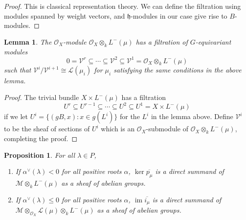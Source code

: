 \documentclass[11pt, a4paper]{article}
\newtheorem{lemma}[theorem]{Lemma}
\newtheorem{proposition}[theorem]{Proposition}
\theoremstyle{definition}
\newcommand{\im}[0]{\operatorname{im}}
\newcommand{\h}{\mathfrak h}
\begin{document}
    \begin{proof}
        This is classical representation theory. We can define the filtration using modules spanned by weight vectors, and $\h$-modules in our case give rise to $B$-modules.
    \end{proof}
    \begin{lemma}
        The $\mathcal O_X$-module $\mathcal O_X\otimes_k L^-(\mu)$ has a filtration of $G$-equivariant modules
        \[0=\mathcal V^r\subseteq\cdots\subseteq \mathcal V^2\subseteq \mathcal V^1=\mathcal O_X\otimes_k L^-(\mu)\]
        such that $\mathcal V^i/\mathcal V^{i+1}\cong\mathcal L(\mu_i)$ for $\mu_i$ satisfying the same conditions in the above lemma.
    \end{lemma}
    \begin{proof}
        The trivial bundle $X\times L^-(\mu)$ has a filtration
        \[U^r\subseteq U^{r-1}\subseteq\cdots\subseteq U^2\subseteq U^1=X\times L^-(\mu)\]
        if we let $U^i=\{(gB, x):x\in g(L^i)\}$ for the $L^i$ in the lemma above. Define $\mathcal V^i$ to be the sheaf of sections of $U^i$ which is an $\mathcal O_X$-submodule of $\mathcal O_X\otimes_k L^-(\mu)$, completing the proof.
    \end{proof}
    \begin{proposition}\label{prop-key-lemma}
        For all $\lambda\in P$,
        \begin{enumerate}[\normalfont(i)]
            \item If $\alpha^\vee(\lambda)< 0$ for all positive roots $\alpha$, $\ker \overline{p_\mu}$ is a direct summand of $\mathcal M\otimes_k L^-(\mu)$ as a sheaf of abelian groups.
            \item If $\alpha^\vee(\lambda)\leqslant 0$ for all positive roots $\alpha$, $\im\overline{i_\mu}$ is a direct summand of $\mathcal M\otimes_{\mathcal O_X}\mathcal L(\mu)\otimes_k L^-(\mu)$ as a sheaf of abelian groups.
        \end{enumerate}
    \end{proposition}
\end{document}
